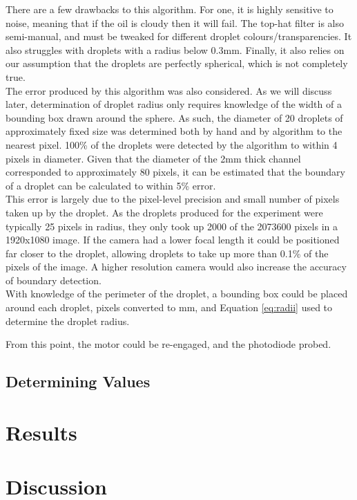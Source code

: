 \documentclass{physics_article_B}
\begin{document}
    There are a few drawbacks to this algorithm. For one, it is highly sensitive to noise, meaning that if the oil is cloudy then it will fail. The top-hat filter is also semi-manual, and must be tweaked for different droplet colours/transparencies. It also struggles with droplets with a radius below 0.3mm. Finally, it also relies on our assumption that the droplets are perfectly spherical, which is not completely true.\\
    
    The error produced by this algorithm was also considered. As we will discuss later, determination of droplet radius only requires knowledge of the width of a bounding box drawn around the sphere. As such, the diameter of 20 droplets of approximately fixed size was determined both by hand and by algorithm to the nearest pixel. 100\% of the droplets were detected by the algorithm to within 4 pixels in diameter. Given that the diameter of the 2mm thick channel corresponded to approximately 80 pixels, it can be estimated that the boundary of a droplet can be calculated to within 5\% error. \\
    
    This error is largely due to the pixel-level precision and small number of pixels taken up by the droplet. As the droplets produced for the experiment were typically 25 pixels in radius, they only took up 2000 of the 2073600 pixels in a 1920x1080 image. If the camera had a lower focal length it could be positioned far closer to the droplet, allowing droplets to take up more than 0.1\% of the pixels of the image. A higher resolution camera would also increase the accuracy of boundary detection. \\
    
    With knowledge of the perimeter of the droplet, a bounding box could be placed around each droplet, pixels converted to mm, and Equation \ref{eq:radii} used to determine the droplet radius.
    
    From this point, the motor could be re-engaged, and the photodiode probed.

    \subsection{Determining Values}

    

    


\section{Results}

\section{Discussion}
\newpage



    

\end{document}
